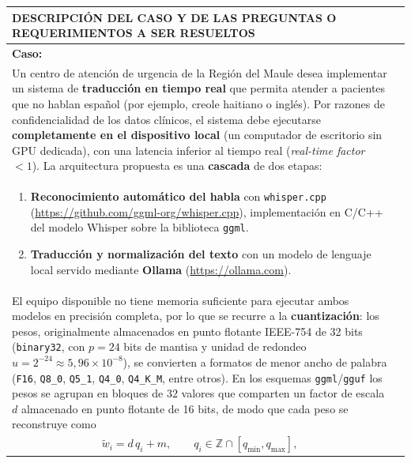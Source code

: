 \documentclass[12pt]{article}
\begin{document}
\newpage
\noindent
\begin{longtable}{|p{\textwidth}|@{}c@{}}
  \hline
  \centering\cellcolor{cyan}\textbf{\color{white}DESCRIPCIÓN DEL CASO Y DE LAS PREGUNTAS O REQUERIMIENTOS A SER RESUELTOS}&\\\hline
  \endhead
  \textbf{Caso:}&\\
  Un centro de atención de urgencia de la Región del Maule desea implementar un sistema de
  \textbf{traducción en tiempo real} que permita atender a pacientes que no hablan español (por ejemplo,
  creole haitiano o inglés). Por razones de confidencialidad de los datos clínicos, el sistema debe
  ejecutarse \textbf{completamente en el dispositivo local} (un computador de escritorio sin GPU dedicada),
  con una latencia inferior al tiempo real (\textit{real-time factor} $<1$). La arquitectura propuesta es
  una \textbf{cascada} de dos etapas:&\\
  \begin{enumerate}\setlength\itemsep{0pt}
  \item \textbf{Reconocimiento automático del habla} con \texttt{whisper.cpp}
  (\url{https://github.com/ggml-org/whisper.cpp}), implementación en C/C++ del modelo Whisper
  sobre la biblioteca \texttt{ggml}.
  \item \textbf{Traducción y normalización del texto} con un modelo de lenguaje local servido mediante
  \textbf{Ollama} (\url{https://ollama.com}).
  \end{enumerate}&\\
  El equipo disponible no tiene memoria suficiente para ejecutar ambos modelos en precisión completa,
  por lo que se recurre a la \textbf{cuantización}: los pesos, originalmente almacenados en punto flotante
  IEEE-754 de 32 bits (\texttt{binary32}, con $p=24$ bits de mantisa y unidad de redondeo
  $u=2^{-24}\approx 5{,}96\times10^{-8}$), se convierten a formatos de menor ancho de palabra
  (\texttt{F16}, \texttt{Q8\_0}, \texttt{Q5\_1}, \texttt{Q4\_0}, \texttt{Q4\_K\_M}, entre otros).
  En los esquemas \texttt{ggml}/\texttt{gguf} los pesos se agrupan en bloques de $32$ valores que comparten
  un factor de escala $d$ almacenado en punto flotante de 16 bits, de modo que cada peso se reconstruye como&\\
  \vspace{-4pt}
  \[
  \tilde{w}_i = d\,q_i + m, \qquad q_i \in \mathbb{Z}\cap[q_{\min},q_{\max}],
  \]
  \vspace{-14pt}&\\

\end{longtable}
\end{document}
